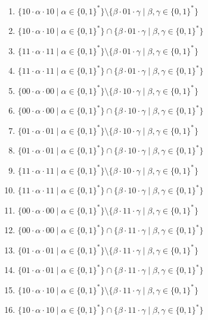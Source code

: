 \documentclass[12pt]{article}
\begin{document}
\begin{enumerate}
  \begin{enumerate}[label=\arabic*)]
    \setlength\itemsep{0.8em}
    \setcounter{enumii}{4}
    \item $\{ 10 \cdot \alpha \cdot 10 \mid \alpha \in \{0, 1\}^* \} \setminus \{ \beta \cdot 01 \cdot \gamma \mid \beta, \gamma \in \{0, 1\}^*\}$
    \item $\{ 10 \cdot \alpha \cdot 10 \mid \alpha \in \{0, 1\}^* \} \cap      \{ \beta \cdot 01 \cdot \gamma \mid \beta, \gamma \in \{0, 1\}^*\}$
    \item $\{ 11 \cdot \alpha \cdot 11 \mid \alpha \in \{0, 1\}^* \} \setminus \{ \beta \cdot 01 \cdot \gamma \mid \beta, \gamma \in \{0, 1\}^*\}$
    \item $\{ 11 \cdot \alpha \cdot 11 \mid \alpha \in \{0, 1\}^* \} \cap      \{ \beta \cdot 01 \cdot \gamma \mid \beta, \gamma \in \{0, 1\}^*\}$
    \item $\{ 00 \cdot \alpha \cdot 00 \mid \alpha \in \{0, 1\}^* \} \setminus \{ \beta \cdot 10 \cdot \gamma \mid \beta, \gamma \in \{0, 1\}^*\}$
    \item $\{ 00 \cdot \alpha \cdot 00 \mid \alpha \in \{0, 1\}^* \} \cap      \{ \beta \cdot 10 \cdot \gamma \mid \beta, \gamma \in \{0, 1\}^*\}$
    \item $\{ 01 \cdot \alpha \cdot 01 \mid \alpha \in \{0, 1\}^* \} \setminus \{ \beta \cdot 10 \cdot \gamma \mid \beta, \gamma \in \{0, 1\}^*\}$
    \item $\{ 01 \cdot \alpha \cdot 01 \mid \alpha \in \{0, 1\}^* \} \cap      \{ \beta \cdot 10 \cdot \gamma \mid \beta, \gamma \in \{0, 1\}^*\}$
    \item $\{ 11 \cdot \alpha \cdot 11 \mid \alpha \in \{0, 1\}^* \} \setminus \{ \beta \cdot 10 \cdot \gamma \mid \beta, \gamma \in \{0, 1\}^*\}$
    \item $\{ 11 \cdot \alpha \cdot 11 \mid \alpha \in \{0, 1\}^* \} \cap      \{ \beta \cdot 10 \cdot \gamma \mid \beta, \gamma \in \{0, 1\}^*\}$
    \item $\{ 00 \cdot \alpha \cdot 00 \mid \alpha \in \{0, 1\}^* \} \setminus \{ \beta \cdot 11 \cdot \gamma \mid \beta, \gamma \in \{0, 1\}^*\}$
    \item $\{ 00 \cdot \alpha \cdot 00 \mid \alpha \in \{0, 1\}^* \} \cap      \{ \beta \cdot 11 \cdot \gamma \mid \beta, \gamma \in \{0, 1\}^*\}$
    \item $\{ 01 \cdot \alpha \cdot 01 \mid \alpha \in \{0, 1\}^* \} \setminus \{ \beta \cdot 11 \cdot \gamma \mid \beta, \gamma \in \{0, 1\}^*\}$
    \item $\{ 01 \cdot \alpha \cdot 01 \mid \alpha \in \{0, 1\}^* \} \cap      \{ \beta \cdot 11 \cdot \gamma \mid \beta, \gamma \in \{0, 1\}^*\}$
    \item $\{ 10 \cdot \alpha \cdot 10 \mid \alpha \in \{0, 1\}^* \} \setminus \{ \beta \cdot 11 \cdot \gamma \mid \beta, \gamma \in \{0, 1\}^*\}$
    \item $\{ 10 \cdot \alpha \cdot 10 \mid \alpha \in \{0, 1\}^* \} \cap      \{ \beta \cdot 11 \cdot \gamma \mid \beta, \gamma \in \{0, 1\}^*\}$


\end{enumerate}
\end{enumerate}
\end{document}

